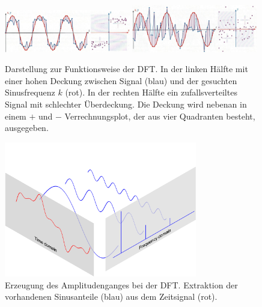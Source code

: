 \begin{figure}
	\centering
	\includegraphics[width=0.49\textwidth]{papers/wavelets/images/2_DFT1.png}
	\includegraphics[width=0.49\textwidth]{papers/wavelets/images/2_DFT2.png}
	\caption{\cite{AndreasMuller.2019} Darstellung zur Funktionsweise der DFT. In der linken Hälfte mit einer hohen Deckung zwischen Signal (blau) und der gesuchten Sinusfrequenz $k$ (rot). In der rechten Hälfte ein zufallsverteiltes Signal mit schlechter Überdeckung. Die Deckung wird nebenan in einem $+$ und $-$ Verrechnungsplot, der aus vier Quadranten besteht, ausgegeben.}
	\label{wavelet:fig:2_DFT1&2}
\end{figure}

\begin{figure}
	\centering
	\includegraphics[width=0.75\textwidth]{papers/wavelets/images/3_AmplitudengangExtraktionDFT.png}
	\caption{\cite{QingkaiKong} Erzeugung des Amplitudenganges bei der DFT. Extraktion der vorhandenen Sinusanteile (blau) aus dem Zeitsignal (rot).}
	\label{wavelet:fig:AmplitudengangExtraktionDFT}
\end{figure}

